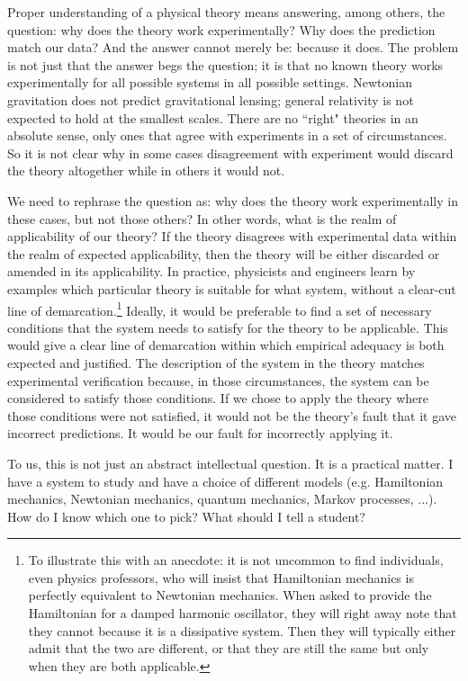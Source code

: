 \documentclass[11pt]{elsarticle}
\begin{document}
Proper understanding of a physical theory means answering, among others, the question: why does the theory work experimentally? Why does the prediction match our data? And the answer cannot merely be: because it does. The problem is not just that the answer begs the question; it is that no known theory works experimentally for all possible systems in all possible settings. Newtonian gravitation does not predict gravitational lensing; general relativity is not expected to hold at the smallest scales. There are no ``right" theories in an absolute sense, only ones that agree with experiments in a set of circumstances. So it is not clear why in some cases disagreement with experiment would discard the theory altogether while in others it would not.

We need to rephrase the question as: why does the theory work experimentally in these cases, but not those others? In other words, what is the realm of applicability of our theory? If the theory disagrees with experimental data within the realm of expected applicability, then the theory will be either discarded or amended in its applicability. In practice, physicists and engineers learn by examples which particular theory is suitable for what system, without a clear-cut line of demarcation.\footnote{To illustrate this with an anecdote: it is not uncommon to find individuals, even physics professors, who will insist that Hamiltonian mechanics is perfectly equivalent to Newtonian mechanics. When asked to provide the Hamiltonian for a damped harmonic oscillator, they will right away note that they cannot because it is a dissipative system. Then they will typically either admit that the two are different, or that they are still the same but only when they are both applicable.} Ideally, it would be preferable to find a set of necessary conditions that the system needs to satisfy for the theory to be applicable. This would give a clear line of demarcation within which empirical adequacy is both expected and justified. The description of the system in the theory matches experimental verification because, in those circumstances, the system can be considered to satisfy those conditions. If we chose to apply the theory where those conditions were not satisfied, it would not be the theory's fault that it gave incorrect predictions. It would be our fault for incorrectly applying it.

To us, this is not just an abstract intellectual question. It is a practical matter. I have a system to study and have a choice of different models (e.g. Hamiltonian mechanics, Newtonian mechanics, quantum mechanics, Markov processes, ...). How do I know which one to pick?  What should I tell a student?
\end{document}
